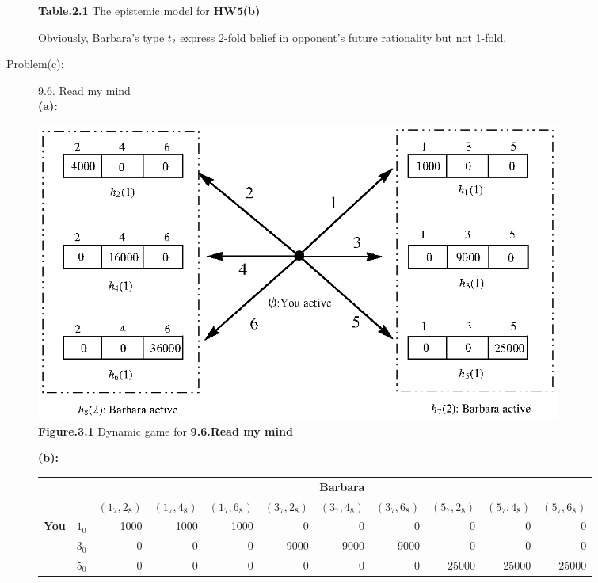 \documentclass{article}
\begin{document}
\begin{description}
\begin{center}
        {\bf Table.2.1 }The epistemic model for {\bf HW5(b)}
    \end{center}
     Obviously, Barbara's type $t_2$ express 2-fold belief in opponent's future rationality but not 1-fold.\\
    \item[Problem(c):]9.6. Read my mind\\
    {\bf (a):} \begin{center}
                    \includegraphics[angle=0, width=0.8\textwidth]{ECON3160A5P3}\\
                    {\bf Figure.3.1 }Dynamic game for {\bf 9.6.Read my mind}
    \end{center}
    \newpage
    {\bf (b):}
    \begin{center}
        \begin{tabular}{rrrrrrrrrrr}
        \hline
        \hline
                   &            &                                                                                 \multicolumn{ 9}{c}{{\bf Barbara}} \\

                   &            &  $(1_7,2_8)$ &  $(1_7,4_8)$ &  $(1_7,6_8)$ &  $(3_7,2_8)$ &  $(3_7,4_8)$ &  $(3_7,6_8)$ &  $(5_7,2_8)$ &  $(5_7,4_8)$ &  $(5_7,6_8)$ \\
        \hline
        \multicolumn{ 1}{c}{{\bf You}} &        $1_0$ &       1000 &       1000 &       1000 &          0 &          0 &          0 &          0 &          0 &          0 \\

        \multicolumn{ 1}{c}{{\bf }} &        $3_0$ &          0 &          0 &          0 &       9000 &       9000 &       9000 &          0 &          0 &          0 \\

        \multicolumn{ 1}{c}{{\bf }} &        $5_0$ &          0 &          0 &          0 &          0 &          0 &          0 &      25000 &      25000 &      25000 \\


\end{tabular}
\end{center}
\end{description}
\end{document}

